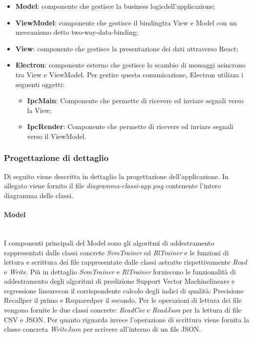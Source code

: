 	\begin{itemize}
		\item \textbf{Model}: componente che gestisce la business logic\glosp dell'applicazione;
		\item \textbf{ViewModel}: componente che gestisce il binding\glosp tra View e Model con un meccanismo detto two-way-data-binding;
		\item \textbf{View}: componente che gestisce la presentazione dei dati attraverso React;
		\item \textbf{Electron}: componente esterno che gestisce lo scambio di messaggi asincrono tra View e ViewModel. Per gestire questa comunicazione, Electron utilizza i seguenti oggetti:
			\begin{itemize}
				\item \textbf{IpcMain}: Componente che permette di ricevere ed inviare segnali verso la View;
				\item \textbf{IpcRender}: Componente che permette di ricevere ed inviare segnali verso il ViewModel.
			\end{itemize}
	\end{itemize}
	\subsubsection{Progettazione di dettaglio}
		Di seguito viene descritta in dettaglio la progettazione dell'applicazione. In allegato viene fornito il file \textit{diagramma-classi-app.png} contenente l'intero diagramma delle classi.
		\paragraph{Model} \mbox{} \\[1mm]
		I componenti principali del Model sono gli algoritmi di addestramento rappresentati dalle classi concrete \textit{SvmTrainer} ed \textit{RlTrainer} e le funzioni di lettura e scrittura dei file rappresentate dalle classi astratte rispettivamente \textit{Read} e \textit{Write}.
		Più in dettaglio \textit{SvmTrainer} e \textit{RlTrainer} forniscono le funzionalità di addestramento degli algoritmi di predizione Support Vector Machine\glosp lineare e regressione lineare\glosp con il corrispondente calcolo degli indici di qualità: Precision\glosp e Recall\glosp per il primo e Rsquared\glosp per il secondo. Per le operazioni di lettura dei file vengono fornite le due classi concrete: \textit{ReadCsv} e \textit{ReadJson} per la lettura di file CSV e JSON. Per quanto riguarda invece l'operazione di scrittura viene fornita la classe concreta \textit{WriteJson} per scrivere all'interno di un file JSON.
